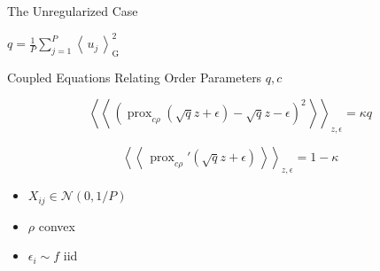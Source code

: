 \documentclass[pdf]{beamer}
\DeclareMathOperator{\prox}{prox}
\newcommand{\avg}[1]{\mbox{$\left\langle \, #1 \, \right\rangle$}}
\newcommand{\qav}[1]{\mbox{$\left\langle\left\langle \, #1 \, \right\rangle\right\rangle$}}
\begin{document}
\begin{frame}{The Unregularized Case}



\begin{center}
$q = \frac{1}{P} \sum_{j=1}^P{\avg{u_j}_{\text{G}}^2}$
\end{center}

\begin{block}{\begin{center}Coupled Equations Relating Order Parameters $q,c$ \end{center}}
\begin{equation*}
\qav{\left(\prox_{c\rho}{(\sqrt{q} z + \epsilon)} -\sqrt{q}z -\epsilon\right)^2}_{z,\epsilon}= \kappa q
\end{equation*}


\begin{equation*}
\qav{\prox_{c\rho}'(\sqrt{q}z + \epsilon)}_{z, \epsilon} = 1-\kappa
\end{equation*}
\end{block}

\vspace{.1in}
\parbox{.45\linewidth}{
\begin{itemize}
    \item $X_{ij}\in \mathcal{N}(0,1/P)$
    \item $\rho$ convex
    \item $\epsilon_i\sim f$ iid
\end{itemize}
}
\parbox{.45\linewidth}{
}
\end{frame}
\end{document}
